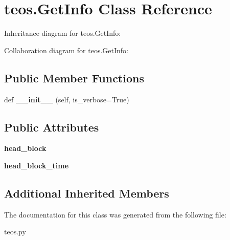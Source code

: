\hypertarget{classteos_1_1GetInfo}{}\section{teos.\+Get\+Info Class Reference}
\label{classteos_1_1GetInfo}


Inheritance diagram for teos.\+Get\+Info\+:


Collaboration diagram for teos.\+Get\+Info\+:
\subsection*{Public Member Functions}
\begin{DoxyCompactItemize}
\item 
\mbox{\label{classteos_1_1GetInfo_a8226089fc3ec66fb492bad0ffadc33d4}} 
def {\bfseries \+\_\+\+\_\+init\+\_\+\+\_\+} (self, is\+\_\+verbose=True)
\end{DoxyCompactItemize}
\subsection*{Public Attributes}
\begin{DoxyCompactItemize}
\item 
\mbox{\label{classteos_1_1GetInfo_af1c35eb9a6928a5377c53befd1dd5f78}} 
{\bfseries head\+\_\+block}
\item 
\mbox{\label{classteos_1_1GetInfo_a90fb2c4a55607356d40119a75e70b050}} 
{\bfseries head\+\_\+block\+\_\+time}
\end{DoxyCompactItemize}
\subsection*{Additional Inherited Members}


The documentation for this class was generated from the following file\+:\begin{DoxyCompactItemize}
\item 
teos.\+py\end{DoxyCompactItemize}
